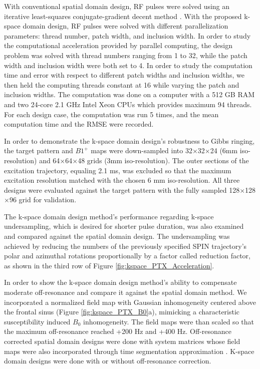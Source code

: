 With conventional spatial domain design, RF pulses were solved using an iterative least-squares conjugate-gradient decent method \cite{Grissom:2006:MRM}. With the proposed k-space domain design, RF pulses were solved with different parallelization parameters: thread number, patch width, and inclusion width. In order to study the computational acceleration provided by parallel computing, the design problem was solved with thread numbers ranging from 1 to 32, while the patch width and inclusion width were both set to 4. In order to study the computation time and error with respect to different patch widths and inclusion widths, we then held the computing threads constant at 16 while varying the patch and inclusion widths. The computation was done on a computer with a 512 GB RAM and two 24-core 2.1 GHz Intel Xeon CPUs which provides maximum 94 threads. For each design case, the computation was run 5 times, and the mean computation time and the RMSE were recorded.

In order to demonstrate the k-space domain design’s robustness to Gibbs ringing, the target pattern and $B1^+$ maps were down-sampled into 32$\times$32$\times$24 (6mm iso-resolution)  and 64$\times$64$\times$48 grids (3mm iso-resolution). The outer sections of the excitation trajectory, equaling 2.1 ms, was excluded so that the maximum excitation resolution matched with the chosen 6 mm iso-resolution. All three designs were evaluated against the target pattern with the fully sampled 128$\times$128$\times$96 grid for validation.

The k-space domain design method's performance regarding k-space undersampling, which is desired for shorter pulse duration, was also examined and compared against the spatial domain design. The undersampling was achieved by reducing the numbers of the previously specified SPIN trajectory's polar and azimuthal rotations proportionally by a factor called reduction factor, as shown in the third row of Figure \ref{fig:kspace_PTX_Acceleration}.    

In order to show the k-space domain design method's ability to compensate moderate off-resonance and compare it against the spatial domain method. We incorporated a normalized field map with Gaussian inhomogeneity centered above the frontal sinus (Figure \ref{fig:kspace_PTX_B0}a), mimicking a characteristic susceptibility induced $B_0$ inhomogeneity. The field maps were than scaled so that the maximum off-resonance reached +200 Hz and +400 Hz. Off-resonance corrected spatial domain designs were done with system matrices whose field maps were also incorporated through time segmentation approximation \cite{fessler2005toeplitz}. K-space domain designs were done with or without off-resonance correction.